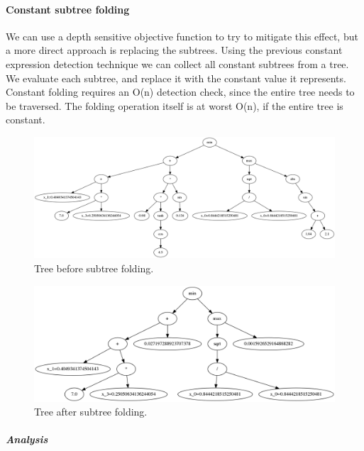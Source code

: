 \paragraph{Constant subtree folding}
We can use a depth sensitive objective function to try to mitigate this effect, but a more direct approach is replacing the subtrees.
Using the previous constant expression detection technique we can collect all constant subtrees from a tree. We evaluate each subtree, and replace it with the constant value it represents. 
Constant folding requires an O(n) detection check, since the entire tree needs to be traversed. The folding operation itself is at worst O(n), if the entire tree is constant.
\begin{figure}
    \centering
    \includegraphics[width=\textwidth,height=\textheight,keepaspectratio]{figures/prefold.png}
    \caption{Tree before subtree folding.}
    \label{fig:prefold}
\end{figure}
\begin{figure}
    \centering
    \includegraphics[width=\textwidth,height=\textheight,keepaspectratio]{figures/postfold.png}
    \caption{Tree after subtree folding.}
    \label{fig:postfold}
\end{figure}
\subparagraph{Analysis}
